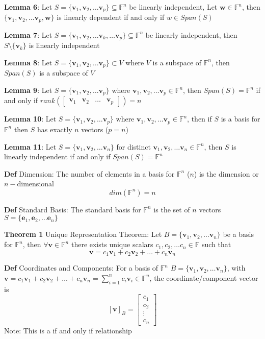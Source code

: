 \documentclass[11pt,notitlepage]{report}
\newcommand{\bb}[1]{\ensuremath{\mathbb{#1}}}
\newcommand{\tbf}[1]{\textbf{#1}}
\begin{document}
\textbf{Lemma 6}: Let $S = \{\tbf v_1, \tbf v_2, \dots \tbf v_p\} \subseteq \bb F^n$ be linearly independent, Let $\tbf w \in \bb F^n$, then $\{\tbf v_1, \tbf v_2, \dots \tbf v_p, \tbf w\}$ is linearly dependent if and only if $w \in Span(S)$

\textbf{Lemma 7}: Let $S = \{\tbf v_1, \tbf v_2, \dots \tbf v_k, \dots \tbf v_p\} \subseteq \bb F^n$ be linearly independent, then $S \setminus \{\tbf v_k\}$ is linearly independent

\textbf{Lemma 8}: Let $S= \{\tbf v_1, \tbf v_2, \dots \tbf v_p\} \subset V$ where $V$ is a subspace of $\bb F^n$, then $Span(S)$ is a subspace of $V$

\textbf{Lemma 9}: Let $S= \{\tbf v_1, \tbf v_2, \dots \tbf v_p\}$ where $\tbf v_1, \tbf v_2, \dots \tbf v_p \in \bb F^n$, then $Span(S) = \bb F^n$ if and only if $rank \left(\begin{bmatrix}
\tbf v_1& \tbf v_2& \dots &\tbf v_p
\end{bmatrix}\right) = n$

\textbf{Lemma 10}: Let $S= \{\tbf v_1, \tbf v_2, \dots \tbf v_p\}$ where $\tbf v_1, \tbf v_2, \dots \tbf v_p \in \bb F^n$, then if $S$ is a basis for $\bb F^n$ then $S$ has exactly $n$ vectors ($p = n$)

\textbf{Lemma 11}: Let $S= \{\tbf v_1, \tbf v_2, \dots \tbf v_n\}$ for distinct $\tbf v_1, \tbf v_2, \dots \tbf v_n \in \bb F^n$, then $S$ is linearly independent if and only if $Span(S) = \bb F^n$

\textbf{Def} Dimension: The number of elements in a basis for $\bb F^n$ ($n$) is the dimension or $n-$dimensional
$$dim(\bb F^n) = n$$

\textbf{Def} Standard Basis: The standard basis for $\bb F^n$ is the set of $n$ vectors $S = \{\tbf e_1, \tbf e_2, \dots \tbf e_n\}$

\textbf{Theorem 1} Unique Representation Theorem: Let $B = \{\tbf v_1, \tbf v_2, \dots \tbf v_n\}$ be a basis for $\bb F^n$, then $\forall \tbf v \in \bb F^n$ there exists unique scalars $c_1, c_2, \dots c_n \in \bb F$ such that
$$\tbf v = c_1\tbf v_1 + c_2\tbf v_2 + \dots + c_n\tbf v_n$$

\textbf{Def} Coordinates and Components: For a basis of $\bb F^n$ $B = \{\tbf v_1, \tbf v_2, \dots \tbf v_n\}$, with $\tbf v = c_1\tbf v_1 + c_2\tbf v_2 + \dots + c_n\tbf v_n = \sum_{i = 1}^n c_i\tbf v_i \in \bb F^n$, the coordinate/component vector is
$$[\tbf v]_B = \begin{bmatrix}c_1\\c_2\\ \vdots \\ c_n\end{bmatrix}$$
\hspace*{5mm} Note: This is a if and only if relationship
\end{document}
